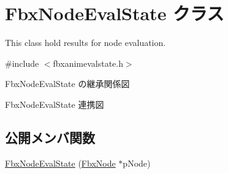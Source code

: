 \hypertarget{class_fbx_node_eval_state}{}\section{Fbx\+Node\+Eval\+State クラス}
\label{class_fbx_node_eval_state}


This class hold results for node evaluation.  




{\ttfamily \#include $<$fbxanimevalstate.\+h$>$}



Fbx\+Node\+Eval\+State の継承関係図


Fbx\+Node\+Eval\+State 連携図
\subsection*{公開メンバ関数}
\begin{DoxyCompactItemize}
\item 
\hyperlink{class_fbx_node_eval_state_af0a429632794570efff26a30fc94b5e0}{Fbx\+Node\+Eval\+State} (\hyperlink{class_fbx_node}{Fbx\+Node} $\ast$p\+Node)
\end{DoxyCompactItemize}
